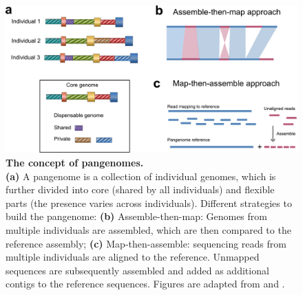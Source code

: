 \documentclass[../main.tex]{subfiles}
\begin{document}
\begin{figure}[!htb]
    \centering
    \includegraphics[width=\textwidth]{intro/fig3.pdf}
        \vspace{3mm}
        \caption[The concept of pangenomes]{\textbf{The concept of pangenomes.} \\
        \footnotesize{\textbf{(a)} A pangenome is a collection of individual genomes, which is further divided into core (shared by all individuals) and flexible parts (the presence varies across individuals). Different strategies to build the pangenome: \textbf{(b)} Assemble-then-map: Genomes from multiple individuals are assembled, which are then compared to the reference assembly; \textbf{(c)} Map-then-assemble: sequencing reads from multiple individuals are aligned to the reference. Unmapped sequences are subsequently assembled and added as additional contigs to the reference sequences. Figures are adapted from \citep{sherman2020pan} and \citep{bayer2020plant}.}}
        \label{fig13:pan}
\end{figure}
\end{document}
